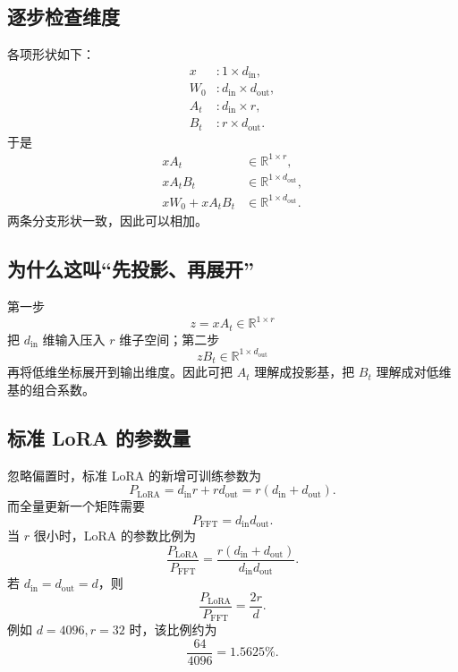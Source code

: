 \documentclass[UTF8,12pt,a4paper,fontset=none]{ctexart}
\numberwithin{equation}{section}
\newcommand{\R}{\mathbb{R}}
\begin{document}
\subsection{逐步检查维度}

各项形状如下：
\begin{align}
  x &: 1\times d_{\mathrm{in}},\\
  W_0 &: d_{\mathrm{in}}\times d_{\mathrm{out}},\\
  A_t &: d_{\mathrm{in}}\times r,\\
  B_t &: r\times d_{\mathrm{out}}.
\end{align}
于是
\begin{align}
  xA_t &\in\R^{1\times r},\\
  xA_tB_t &\in\R^{1\times d_{\mathrm{out}}},\\
  xW_0+xA_tB_t &\in\R^{1\times d_{\mathrm{out}}}.
\end{align}
两条分支形状一致，因此可以相加。

\subsection{为什么这叫“先投影、再展开”}

第一步
\begin{equation}
  z=xA_t\in\R^{1\times r}
\end{equation}
把 $d_{\mathrm{in}}$ 维输入压入 $r$ 维子空间；第二步
\begin{equation}
  zB_t\in\R^{1\times d_{\mathrm{out}}}
\end{equation}
再将低维坐标展开到输出维度。因此可把 $A_t$ 理解成投影基，把 $B_t$ 理解成对低维基的组合系数。

\subsection{标准 LoRA 的参数量}

忽略偏置时，标准 LoRA 的新增可训练参数为
\begin{equation}
  P_{\mathrm{LoRA}}
  =d_{\mathrm{in}}r+rd_{\mathrm{out}}
  =r(d_{\mathrm{in}}+d_{\mathrm{out}}).
  \label{eq:lora-param}
\end{equation}
而全量更新一个矩阵需要
\begin{equation}
  P_{\mathrm{FFT}}=d_{\mathrm{in}}d_{\mathrm{out}}.
\end{equation}
当 $r$ 很小时，LoRA 的参数比例为
\begin{equation}
  \frac{P_{\mathrm{LoRA}}}{P_{\mathrm{FFT}}}
  =\frac{r(d_{\mathrm{in}}+d_{\mathrm{out}})}{d_{\mathrm{in}}d_{\mathrm{out}}}.
\end{equation}
若 $d_{\mathrm{in}}=d_{\mathrm{out}}=d$，则
\begin{equation}
  \frac{P_{\mathrm{LoRA}}}{P_{\mathrm{FFT}}}=\frac{2r}{d}.
\end{equation}
例如 $d=4096,r=32$ 时，该比例约为
\begin{equation}
  \frac{64}{4096}=1.5625\%.
\end{equation}
\end{document}
